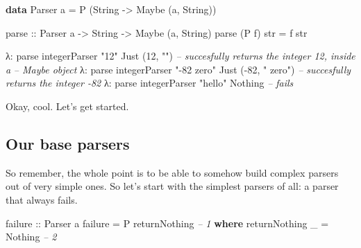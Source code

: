 \documentclass[]{article}
\newenvironment{Shaded}{}{}
\newcommand{\KeywordTok}[1]{\textcolor[rgb]{0.00,0.44,0.13}{\textbf{{#1}}}}
\newcommand{\DataTypeTok}[1]{\textcolor[rgb]{0.56,0.13,0.00}{{#1}}}
\newcommand{\DecValTok}[1]{\textcolor[rgb]{0.25,0.63,0.44}{{#1}}}
\newcommand{\StringTok}[1]{\textcolor[rgb]{0.25,0.44,0.63}{{#1}}}
\newcommand{\CommentTok}[1]{\textcolor[rgb]{0.38,0.63,0.69}{\textit{{#1}}}}
\newcommand{\OtherTok}[1]{\textcolor[rgb]{0.00,0.44,0.13}{{#1}}}
\newcommand{\FunctionTok}[1]{\textcolor[rgb]{0.02,0.16,0.49}{{#1}}}
\newcommand{\NormalTok}[1]{{#1}}
\begin{document}
\begin{Shaded}
\begin{Highlighting}[]
\KeywordTok{data} \DataTypeTok{Parser} \NormalTok{a }\FunctionTok{=} \DataTypeTok{P} \NormalTok{(}\DataTypeTok{String} \OtherTok{->} \DataTypeTok{Maybe} \NormalTok{(a, }\DataTypeTok{String}\NormalTok{))}

\OtherTok{parse ::} \DataTypeTok{Parser} \NormalTok{a }\OtherTok{->} \DataTypeTok{String} \OtherTok{->} \DataTypeTok{Maybe} \NormalTok{(a, }\DataTypeTok{String}\NormalTok{)}
\NormalTok{parse (}\DataTypeTok{P} \NormalTok{f) str }\FunctionTok{=} \NormalTok{f str}
\end{Highlighting}
\end{Shaded}

\begin{Shaded}
\begin{Highlighting}[]
\NormalTok{λ}\FunctionTok{:} \NormalTok{parse integerParser }\StringTok{"12"}
\DataTypeTok{Just} \NormalTok{(}\DecValTok{12}\NormalTok{, }\StringTok{""}\NormalTok{)               }\CommentTok{-- succesfully returns the integer 12, inside a}
                            \CommentTok{-- Maybe object}
\NormalTok{λ}\FunctionTok{:} \NormalTok{parse integerParser }\StringTok{"-82 zero"}
\DataTypeTok{Just} \NormalTok{(}\FunctionTok{-}\DecValTok{82}\NormalTok{, }\StringTok{" zero"}\NormalTok{)         }\CommentTok{-- succesfully returns the integer -82}
\NormalTok{λ}\FunctionTok{:} \NormalTok{parse integerParser }\StringTok{"hello"}
\DataTypeTok{Nothing}                     \CommentTok{-- fails}
\end{Highlighting}
\end{Shaded}

Okay, cool. Let's get started.

\subsection{Our base parsers}\label{our-base-parsers}

So remember, the whole point is to be able to somehow build complex
parsers out of very simple ones. So let's start with the simplest
parsers of all: a parser that always fails.

\begin{Shaded}
\begin{Highlighting}[]
\OtherTok{failure ::} \DataTypeTok{Parser} \NormalTok{a}
\NormalTok{failure }\FunctionTok{=} \DataTypeTok{P} \NormalTok{returnNothing                   }\CommentTok{-- 1}
    \KeywordTok{where}
        \NormalTok{returnNothing _ }\FunctionTok{=} \DataTypeTok{Nothing}           \CommentTok{-- 2}
\end{Highlighting}
\end{Shaded}
\end{document}
